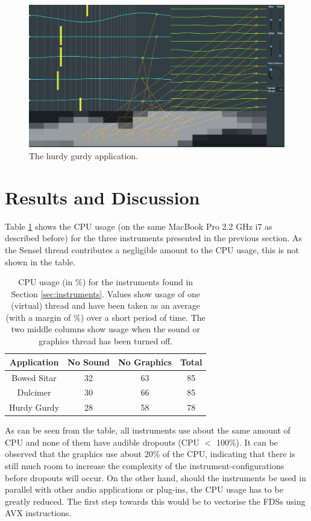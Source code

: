 \begin{figure}[h]
\centering
\includegraphics[width=\paperFigWidth\textwidth]{figures/HurdyGurdy.png}
\caption{The hurdy gurdy application. \label{fig:hurdyGurdy}}
\end{figure}

\section{Results and Discussion}\label{sec:discussion}
Table \ref{tab:CPU} shows the CPU usage (on the same MacBook Pro 2.2 GHz i7 as described before) for the three instruments presented in the previous section. As the Sensel thread contributes a negligible amount to the CPU usage, this is not shown in the table.

\begin{table}[h]
\centering
\begin{tabular}{|c|c|c|c|}
\hline
Application & No Sound & No Graphics & Total \\
\hline
Bowed Sitar &32 &63 &85 \\
Dulcimer &30 &66 &85 \\
Hurdy Gurdy &28 &58 &78 \\
\hline
\end{tabular}\caption{CPU usage (in \%) for the instruments found in Section \ref{sec:instruments}. Values show usage of one (virtual) thread and have been taken as an average (with a margin of \%) over a short period of time. The two middle columns show usage when the sound or graphics thread has been turned off.}\label{tab:CPU}
\end{table}

\noindent As can be seen from the table, all instruments use about the same amount of CPU and none of them have audible dropouts (CPU $<$ 100\%). It can be observed that the graphics use about 20\% of the CPU, indicating that there is still much room to increase the complexity of the instrument-configurations before dropouts will occur. On the other hand, should the instruments be used in parallel with other audio applications or plug-ins, the CPU usage has to be greatly reduced. The first step towards this would be to vectorise the FDSs using AVX instructions.


